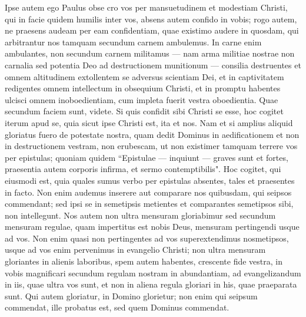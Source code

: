 \begin{biblechapter}  
\verse Ipse autem ego Paulus obse cro vos per mansuetudinem et modestiam Christi, qui in facie quidem humilis inter vos, absens autem confido in vobis;  
\verse rogo autem, ne praesens audeam per eam confidentiam, quae existimo audere in quosdam, qui arbitrantur nos tamquam secundum carnem ambulemus. 
\verse In carne enim ambulantes, non secundum carnem militamus 
\verse — nam arma militiae nostrae non carnalia sed potentia Deo ad destructionem munitionum — consilia destruentes  
\verse et omnem altitudinem extollentem se adversus scientiam Dei, et in captivitatem redigentes omnem intellectum in obsequium Christi, 
\verse et in promptu habentes ulcisci omnem inoboedientiam, cum impleta fuerit vestra oboedientia. 
\verse Quae secundum faciem sunt, videte. Si quis confidit sibi Christi se esse, hoc cogitet iterum apud se, quia sicut ipse Christi est, ita et nos. 
\verse Nam et si amplius aliquid gloriatus fuero de potestate nostra, quam dedit Dominus in aedificationem et non in destructionem vestram, non erubescam, 
\verse ut non existimer tamquam terrere vos per epistulas; 
\verse quoniam quidem “Epistulae — inquiunt — graves sunt et fortes, praesentia autem corporis infirma, et sermo contemptibilis". 
\verse Hoc cogitet, qui eiusmodi est, quia quales sumus verbo per epistulas absentes, tales et praesentes in facto. 
\verse Non enim audemus inserere aut comparare nos quibusdam, qui seipsos commendant; sed ipsi se in semetipsis metientes et comparantes semetipsos sibi, non intellegunt. 
\verse Nos autem non ultra mensuram gloriabimur sed secundum mensuram regulae, quam impertitus est nobis Deus, mensuram pertingendi usque ad vos. 
\verse Non enim quasi non pertingentes ad vos superextendimus nosmetipsos, usque ad vos enim pervenimus in evangelio Christi; 
\verse non ultra mensuram gloriantes in alienis laboribus, spem autem habentes, crescente fide vestra, in vobis magnificari secundum regulam nostram in abundantiam, 
\verse ad evangelizandum in iis, quae ultra vos sunt, et non in aliena regula gloriari in his, quae praeparata sunt. 
\verse Qui autem gloriatur, in Domino glorietur; 
\verse non enim qui seipsum commendat, ille probatus est, sed quem Dominus commendat. 
\end{biblechapter}

